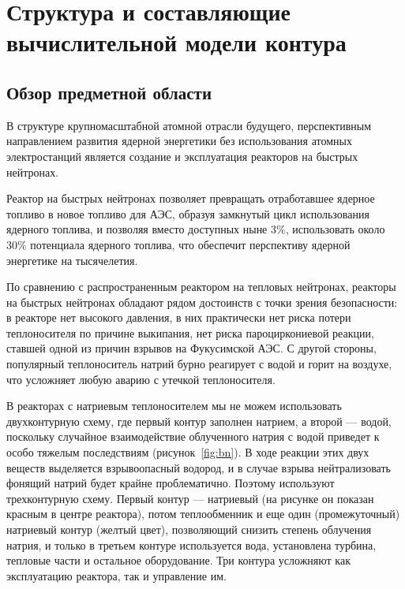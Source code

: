 
\section{Структура и составляющие вычислительной модели контура}

\subsection{Обзор предметной области}

В структуре крупномасштабной атомной отрасли будущего, перспективным направлением развития ядерной энергетики без использования атомных электростанций является создание и эксплуатация реакторов на быстрых нейтронах.

Реактор на быстрых нейтронах позволяет превращать отработавшее ядерное топливо в новое топливо для АЭС, образуя замкнутый цикл использования ядерного топлива, и позволяя вместо доступных ныне 3\%, использовать около 30\% потенциала ядерного топлива, что обеспечит перспективу ядерной энергетике на тысячелетия.

По сравнению с распространенным реактором на тепловых нейтронах, реакторы на быстрых нейтронах обладают рядом достоинств с точки зрения безопасности: в реакторе нет высокого давления, в них практически нет риска потери теплоносителя по причине выкипания, нет риска пароциркониевой реакции, ставшей одной из причин взрывов на Фукусимской АЭС. С другой стороны, популярный теплоноситель натрий бурно реагирует с водой и горит на воздухе, что усложняет любую аварию с утечкой теплоносителя.

В реакторах с натриевым теплоносителем мы не можем использовать двухконтурную схему, где первый контур заполнен натрием, а второй — водой, поскольку случайное взаимодействие облученного натрия с водой приведет к особо тяжелым последствиям (рисунок~\ref{fig:bn}). В ходе реакции этих двух веществ выделяется взрывоопасный водород, и в случае взрыва нейтрализовать фонящий натрий будет крайне проблематично. Поэтому используют трехконтурную схему. Первый контур — натриевый (на рисунке он показан красным в центре реактора), потом теплообменник и еще один (промежуточный) натриевый контур (желтый цвет), позволяющий снизить степень облучения натрия, и только в третьем контуре используется вода, установлена турбина, тепловые части и остальное оборудование. Три контура усложняют как эксплуатацию реактора, так и управление им.

